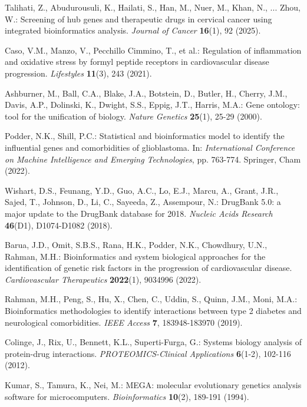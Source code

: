 \documentclass[a4paper,12pt,openbib,oneside]{memoir}
\theoremstyle{plain}
\theoremstyle{plain}
\theoremstyle{plain}
\theoremstyle{definition}
\theoremstyle{plain}
\theoremstyle{plain}
\theoremstyle{plain}
\begin{document}
\begin{thebibliography}{45}
Talihati, Z., Abudurousuli, K., Hailati, S., Han, M., Nuer, M., Khan, N., ... Zhou, W.: Screening of hub genes and therapeutic drugs in cervical cancer using integrated bioinformatics analysis. \emph{Journal of Cancer} \textbf{16}(1), 92 (2025).

Caso, V.M., Manzo, V., Pecchillo Cimmino, T., et al.: Regulation of inflammation and oxidative stress by formyl peptide receptors in cardiovascular disease progression. \emph{Lifestyles} \textbf{11}(3), 243 (2021).

Ashburner, M., Ball, C.A., Blake, J.A., Botstein, D., Butler, H., Cherry, J.M., Davis, A.P., Dolinski, K., Dwight, S.S., Eppig, J.T., Harris, M.A.: Gene ontology: tool for the unification of biology. \emph{Nature Genetics} \textbf{25}(1), 25-29 (2000).

Podder, N.K., Shill, P.C.: Statistical and bioinformatics model to identify the influential genes and comorbidities of glioblastoma. In: \emph{International Conference on Machine Intelligence and Emerging Technologies}, pp. 763-774. Springer, Cham (2022).

Wishart, D.S., Feunang, Y.D., Guo, A.C., Lo, E.J., Marcu, A., Grant, J.R., Sajed, T., Johnson, D., Li, C., Sayeeda, Z., Assempour, N.: DrugBank 5.0: a major update to the DrugBank database for 2018. \emph{Nucleic Acids Research} \textbf{46}(D1), D1074-D1082 (2018).

Barua, J.D., Omit, S.B.S., Rana, H.K., Podder, N.K., Chowdhury, U.N., Rahman, M.H.: Bioinformatics and system biological approaches for the identification of genetic risk factors in the progression of cardiovascular disease. \emph{Cardiovascular Therapeutics} \textbf{2022}(1), 9034996 (2022).

Rahman, M.H., Peng, S., Hu, X., Chen, C., Uddin, S., Quinn, J.M., Moni, M.A.: Bioinformatics methodologies to identify interactions between type 2 diabetes and neurological comorbidities. \emph{IEEE Access} \textbf{7}, 183948-183970 (2019).

Colinge, J., Rix, U., Bennett, K.L., Superti-Furga, G.: Systems biology analysis of protein-drug interactions. \emph{PROTEOMICS-Clinical Applications} \textbf{6}(1-2), 102-116 (2012).

Kumar, S., Tamura, K., Nei, M.: MEGA: molecular evolutionary genetics analysis software for microcomputers. \emph{Bioinformatics} \textbf{10}(2), 189-191 (1994).


\end{thebibliography}
\end{document}
